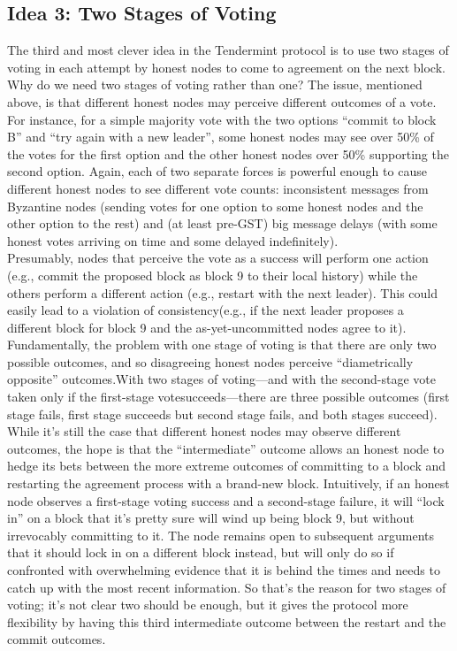 \subsection{Idea 3: Two Stages of Voting}
The third and most clever idea in the Tendermint protocol is to use two stages of voting in each attempt by honest nodes to come to 
agreement on the next block. Why do we need two stages of voting rather than one? The issue, mentioned above, is that different honest 
nodes may perceive different outcomes of a vote. For instance, for a simple majority vote with the two options “commit to block B” and 
“try again with a new leader”, some honest nodes may see over 50\% of the votes for the first option and the other honest nodes over 50\% 
supporting the second option. Again, each of two separate forces is powerful enough to cause different honest nodes to see different vote 
counts: inconsistent messages from Byzantine nodes (sending votes for one option to some honest nodes and the other option to the rest) 
and (at least pre-GST) big message delays (with some honest votes arriving on time and some delayed indefinitely).\\Presumably, nodes that 
perceive the vote as a success will perform one action (e.g., commit the proposed block as block 9 to their local history) while the others 
perform a different action (e.g., restart with the next leader). This could easily lead to a violation of consistency(e.g., if the next 
leader proposes a different block for block 9 and the as-yet-uncommitted nodes agree to it).\\Fundamentally, the problem with one stage of 
voting is that there are only two possible outcomes, and so disagreeing honest nodes perceive “diametrically opposite” outcomes.With two 
stages of voting—and with the second-stage vote taken only if the first-stage votesucceeds—there are three possible outcomes (first stage 
fails, first stage succeeds but second stage fails, and both stages succeed). While it’s still the case that different honest nodes may 
observe different outcomes, the hope is that the “intermediate” outcome allows an honest node to hedge its bets between the more extreme 
outcomes of committing to a block and restarting the agreement process with a brand-new block. Intuitively, if an honest node observes a 
first-stage voting success and a second-stage failure, it will “lock in” on a block that it’s pretty sure will wind up being block 9, but 
without irrevocably committing to it. The node remains open to subsequent arguments that it should lock in on a different block instead, 
but will only do so if confronted with overwhelming evidence that it is behind the times and needs to catch up with the most recent 
information. So that's the reason for two stages of voting; it's not clear two should be enough, but it gives the protocol more flexibility 
by having this third intermediate outcome between the restart and the commit outcomes.

